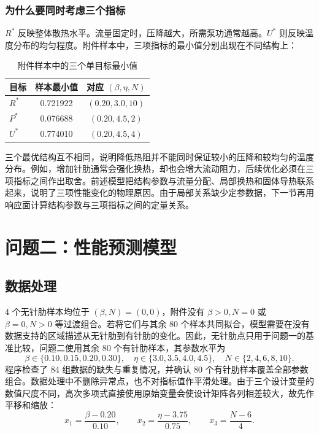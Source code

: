\documentclass[withoutpreface,bwprint]{cumcmthesis}
\newcommand{\Rstar}{R^{*}}
\newcommand{\Pstar}{P^{*}}
\newcommand{\Ustar}{U^{*}}
\begin{document}
\subsubsection{为什么要同时考虑三个指标}
$\Rstar$ 反映整体散热水平。流量固定时，压降越大，所需泵功通常越高。$\Ustar$ 则反映温度分布的均匀程度。附件样本中，三项指标的最小值分别出现在不同结构上：
\begin{table}[H]
\centering
\caption{附件样本中的三个单目标最小值}
\begin{tabular}{lcc}
\toprule
目标 & 样本最小值 & 对应 $(\beta,\eta,N)$\\
\midrule
$\Rstar$ & 0.721922 & $(0.20,3.0,10)$\\
$\Pstar$ & 0.076688 & $(0.20,4.5,2)$\\
$\Ustar$ & 0.774010 & $(0.20,4.5,4)$\\
\bottomrule
\end{tabular}
\end{table}
三个最优结构互不相同，说明降低热阻并不能同时保证较小的压降和较均匀的温度分布。例如，增加针肋通常会强化换热，却也会增大流动阻力，后续优化必须在三项指标之间作出取舍。前述模型把结构参数与流量分配、局部换热和固体导热联系起来，说明了三项性能变化的物理原因。由于局部关系缺少定参数据，下一节再用响应面计算结构参数与三项指标之间的定量关系。

\section{问题二：性能预测模型}
\subsection{数据处理}
4 个无针肋样本均位于 $(\beta,N)=(0,0)$，附件没有 $\beta>0,N=0$ 或 $\beta=0,N>0$ 等过渡组合。若将它们与其余 80 个样本共同拟合，模型需要在没有数据支持的区域描述从无针肋到有针肋的变化。因此，无针肋点只用于问题一的基准比较，问题二使用其余 80 个有针肋样本，其参数水平为
\begin{equation*}
\beta\in\{0.10,0.15,0.20,0.30\},\quad
\eta\in\{3.0,3.5,4.0,4.5\},\quad N\in\{2,4,6,8,10\}.
\end{equation*}
程序检查了 84 组数据的缺失与重复情况，并确认 80 个有针肋样本覆盖全部参数组合。数据处理中不删除异常点，也不对指标值作平滑处理。由于三个设计变量的数值尺度不同，高次多项式直接使用原始变量会使设计矩阵各列相差较大，故先作平移和缩放：
\begin{equation}
x_1=\frac{\beta-0.20}{0.10},\qquad
x_2=\frac{\eta-3.75}{0.75},\qquad
x_3=\frac{N-6}{4}.
\label{eq:encoding}
\end{equation}
\end{document}
